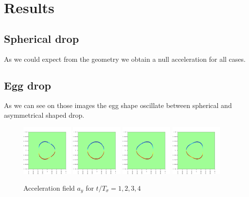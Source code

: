 \documentclass[10pt,a4paper,openany]{article}
\theoremstyle{mytheoremstyle}
\theoremstyle{mytheoremstyle}
\theoremstyle{myproblemstyle}
\begin{document}
\section{Results}

\subsection{Spherical drop}
As we could expect from the geometry we obtain a null acceleration for all cases. 
\subsection{Egg drop}
As we can see on those images the egg shape oscillate between spherical and asymmetrical shaped drop.
\begin{figure}[h!]
    \centering
    \includegraphics[width=0.23\textwidth]{image/Tension/Asym0002.png}
    \includegraphics[width=0.23\textwidth]{image/Tension/Asym0003.png}
    \includegraphics[width=0.23\textwidth]{image/Tension/Asym0004.png}
    \includegraphics[width=0.23\textwidth]{image/Tension/Asym0005.png}
    \caption{Acceleration field $a_y$ for $t /T_\sigma = 1, 2, 3, 4$}
\end{figure}
\end{document}
